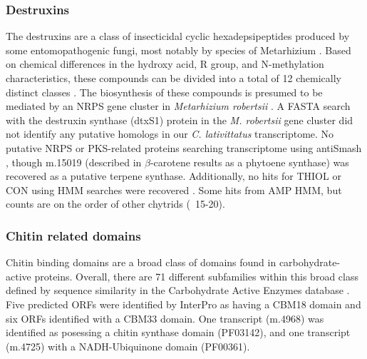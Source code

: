 \subsubsection*{Destruxins}
The destruxins are a class of insecticidal cyclic hexadepsipeptides produced by some entomopathogenic fungi, most notably by species of Metarhizium \cite{Donzelli2012,Wang2012}. Based on chemical differences in the hydroxy acid, R group, and N-methylation characteristics, these compounds can be divided into a total of 12 chemically distinct classes \cite{Pedras2002,Wang2012}. The biosynthesis of these compounds is presumed to be mediated by an NRPS gene cluster in \textit{Metarhizium robertsii} \cite{Wang2012}. A FASTA search with the destruxin synthase (dtxS1) protein in the \textit{M. robertsii} gene cluster did not identify any putative homologs in our \textit{C. lativittatus} transcriptome. No putative NRPS or PKS-related proteins searching transcriptome using antiSmash \cite{Blin2013}, though m.15019 (described in $\beta$-carotene results as a phytoene synthase) was recovered as a putative terpene synthase. Additionally, no hits for THIOL or CON using HMM searches were recovered \cite{Bushley2010}. Some hits from AMP HMM, but counts are on the order of other chytrids (~15-20).\\
\subsubsection*{Chitin related domains}
Chitin binding domains are a broad class of domains found in carbohydrate-active proteins. Overall, there are 71 different subfamilies within this broad class defined by sequence similarity in the Carbohydrate Active Enzymes database \cite{Lombard2014}. Five predicted ORFs were identified by InterPro as having a CBM18 domain and six ORFs identified with a CBM33 domain. One transcript (m.4968) was identified as posessing a chitin synthase domain (PF03142), and one transcript (m.4725) with a NADH-Ubiquinone domain (PF00361).\\
